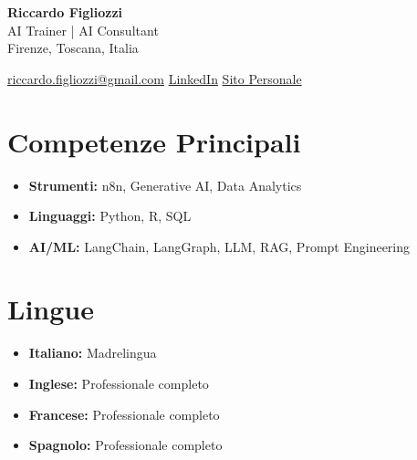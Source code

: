 \documentclass[11pt,a4paper]{article}
\begin{document}
\begin{center}
    {\LARGE\bfseries\color{primary} Riccardo Figliozzi}\\[4pt]
    {\large AI Trainer | AI Consultant}\\[4pt]
    Firenze, Toscana, Italia
\end{center}

\vspace{4pt}

\begin{center}
    \href{mailto:riccardo.figliozzi@gmail.com}{riccardo.figliozzi@gmail.com} \quad
    \href{https://linkedin.com/in/riccardofigliozzi}{LinkedIn} \quad
    \href{https://riccardofigliozzi.com}{Sito Personale}
\end{center}

\vspace{4pt}

\section{Competenze Principali}
\begin{itemize}[leftmargin=*, nosep]
    \item \textbf{Strumenti:} n8n, Generative AI, Data Analytics
    \item \textbf{Linguaggi:} Python, R, SQL
    \item \textbf{AI/ML:} LangChain, LangGraph, LLM, RAG, Prompt Engineering
\end{itemize}

\section{Lingue}
\begin{itemize}[leftmargin=*, nosep]
    \item \textbf{Italiano:} Madrelingua
    \item \textbf{Inglese:} Professionale completo
    \item \textbf{Francese:} Professionale completo
    \item \textbf{Spagnolo:} Professionale completo
\end{itemize}

\end{document}
